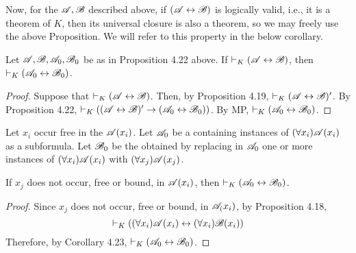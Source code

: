 Now, for the \wfs{} \(\mathscr{A}, \mathscr{B}\) described above, if \((\mathscr{A} \leftrightarrow \mathscr{B})\) is logically valid, i.e., it is a theorem of \(K\), then its universal closure is also a theorem, so we may freely use the above Proposition. We will refer to this property in the below corollary.

\begin{corollary}
  Let \(\mathscr{A}, \mathscr{B}, \mathscr{A}_0, \mathscr{B}_0\) be as in Proposition 4.22 above. If \(\vdash_{K} (\mathscr{A} \leftrightarrow \mathscr{B})\), then \(\vdash_{K} (\mathscr{A}_0 \leftrightarrow \mathscr{B}_0)\).

  \begin{proof}
    Suppose that \(\vdash_{K} (\mathscr{A} \leftrightarrow \mathscr{B})\). Then, by Proposition 4.19, \(\vdash_{K} (\mathscr{A} \leftrightarrow \mathscr{B})'\). By Proposition 4.22, \(\vdash_{K} ((\mathscr{A} \leftrightarrow \mathscr{B})' \rightarrow (\mathscr{A}_0 \leftrightarrow \mathscr{B}_0))\). By MP, \(\vdash_{K} (\mathscr{A}_0 \leftrightarrow \mathscr{B}_0)\).
  \end{proof}
\end{corollary}

\begin{corollary}
  Let \(x_i\) occur free in the \wf{} \(\mathscr{A}(x_i)\). Let \(\mathscr{A}_0\) be a \wf{} containing instances of \((\forall x_i)\mathscr{A}(x_i)\) as a subformula. Let \(\mathscr{B}_0\) be the \wf{} obtained by replacing in \(\mathscr{A}_0\) one or more instances of \((\forall x_i)\mathscr{A}(x_i)\) with \((\forall x_j)\mathscr{A}(x_j)\).

  If \(x_j\) does not occur, free or bound, in \(\mathscr{A}(x_i)\), then \(\vdash_{K} (\mathscr{A}_0 \leftrightarrow \mathscr{B}_0)\).

  \begin{proof}
    Since \(x_j\) does not occur, free or bound, in \(\mathscr{A}_(x_i)\), by Proposition 4.18,
      \[\vdash_{K} ((\forall x_i)\mathscr{A}(x_i) \leftrightarrow (\forall x_i)\mathscr{B}(x_i))\]
    Therefore, by Corollary 4.23, \(\vdash_{K} (\mathscr{A}_0 \leftrightarrow \mathscr{B}_0)\).
  \end{proof}
\end{corollary}

